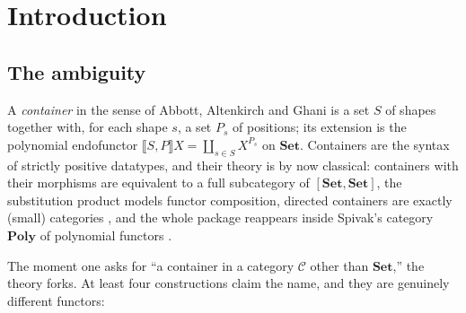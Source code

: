 \documentclass[11pt]{amsart}
\theoremstyle{plain}
\theoremstyle{definition}
\theoremstyle{remark}
\newcommand{\C}{\mathcal{C}}
\newcommand{\Set}{\mathbf{Set}}
\newcommand{\Poly}{\mathbf{Poly}}
\newcommand{\ext}[1]{\llbracket #1 \rrbracket}
\newcommand{\coprodd}{\textstyle\coprod}
\begin{document}
\begin{center}\small
{}
\end{center}

\section{Introduction}

\subsection{The ambiguity}
A \emph{container} in the sense of Abbott, Altenkirch and Ghani \cite{AAG} is a set $S$ of shapes
together with, for each shape $s$, a set $P_s$ of positions; its extension is the polynomial
endofunctor $\ext{S,P}X = \coprodd_{s\in S} X^{P_s}$ on $\Set$. Containers are the syntax of
strictly positive datatypes, and their theory is by now classical: containers with their morphisms
are equivalent to a full subcategory of $[\Set,\Set]$, the substitution product models functor
composition, directed containers are exactly (small) categories \cite{AhmanUustalu}, and the whole
package reappears inside Spivak's category $\Poly$ of polynomial functors \cite{NiuSpivak}.

The moment one asks for ``a container in a category $\C$ other than $\Set$,'' the theory forks.
At least four constructions claim the name, and they are genuinely different functors:
\end{document}
